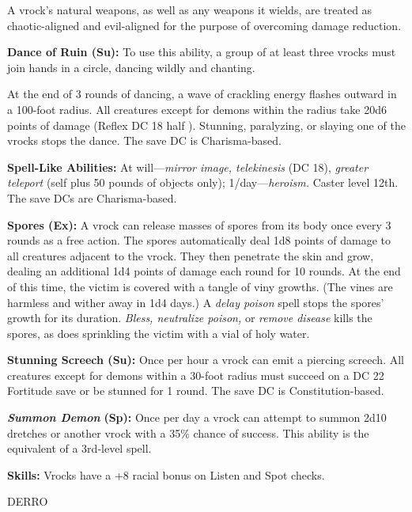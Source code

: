 \documentclass{article}
\begin{document}
A vrock's natural weapons, as well as any weapons it wields, are treated as chaotic-aligned 
and evil-aligned for the purpose of overcoming damage reduction.

\textbf{Dance of Ruin (Su):} To use this ability, a group of at least three vrocks 
must join hands in a circle, dancing wildly and chanting. 

At the end of 3 rounds of dancing, a wave of crackling energy flashes outward in 
a 100-foot radius. All creatures except for demons within the radius take 20d6 
points of damage (Reflex DC 18 half ). Stunning, paralyzing, or slaying one of 
the vrocks stops the dance. The save DC is Charisma-based.

\textbf{Spell-Like Abilities:} At will---\textit{mirror image, telekinesis }(DC 
18), \textit{greater teleport }(self plus 50 pounds of objects only); 1/day---\textit{heroism. 
}Caster level 12th. The save DCs are Charisma-based.

\textbf{Spores (Ex): }A vrock can release masses of spores from its body once every 
3 rounds as a free action. The spores automatically deal 1d8 points of damage to 
all creatures adjacent to the vrock. They then penetrate the skin and grow, dealing 
an additional 1d4 points of damage each round for 10 rounds. At the end of this 
time, the victim is covered with a tangle of viny growths. (The vines are harmless 
and wither away in 1d4 days.) A \textit{delay poison }spell stops the spores' growth 
for its duration. \textit{Bless, neutralize poison, }or \textit{remove disease 
}kills the spores, as does sprinkling the victim with a vial of holy water.

\textbf{Stunning Screech (Su):} Once per hour a vrock can emit a piercing screech. 
All creatures except for demons within a 30-foot radius must succeed on a DC 22 
Fortitude save or be stunned for 1 round. The save DC is Constitution-based.

\textit{\textbf{Summon Demon }}\textbf{(Sp): }Once per day a vrock can attempt 
to summon 2d10 dretches or another vrock with a 35\% chance of success. This ability 
is the equivalent of a 3rd-level spell.

\textbf{Skills:} Vrocks have a +8 racial bonus on Listen and Spot checks.

\vspace{12pt}
{\LARGE{}DERRO}
\end{document}
